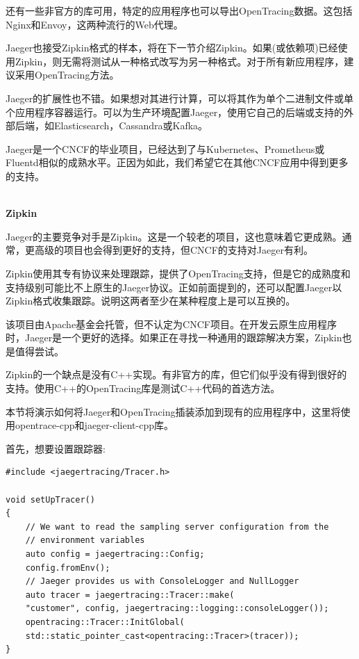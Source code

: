 还有一些非官方的库可用，特定的应用程序也可以导出OpenTracing数据。这包括Nginx和Envoy，这两种流行的Web代理。

Jaeger也接受Zipkin格式的样本，将在下一节介绍Zipkin。如果(或依赖项)已经使用Zipkin，则无需将测试从一种格式改写为另一种格式。对于所有新应用程序，建议采用OpenTracing方法。

Jaeger的扩展性也不错。如果想对其进行计算，可以将其作为单个二进制文件或单个应用程序容器运行。可以为生产环境配置Jaeger，使用它自己的后端或支持的外部后端，如Elasticsearch，Cassandra或Kafka。

Jaeger是一个CNCF的毕业项目，已经达到了与Kubernetes、Prometheus或Fluentd相似的成熟水平。正因为如此，我们希望它在其他CNCF应用中得到更多的支持。

\hspace*{\fill} \\ %
\noindent
\textbf{Zipkin}

Jaeger的主要竞争对手是Zipkin。这是一个较老的项目，这也意味着它更成熟。通常，更高级的项目也会得到更好的支持，但CNCF的支持对Jaeger有利。

Zipkin使用其专有协议来处理跟踪，提供了OpenTracing支持，但是它的成熟度和支持级别可能比不上原生的Jaeger协议。正如前面提到的，还可以配置Jaeger以Zipkin格式收集跟踪。说明这两者至少在某种程度上是可以互换的。

该项目由Apache基金会托管，但不认定为CNCF项目。在开发云原生应用程序时，Jaeger是一个更好的选择。如果正在寻找一种通用的跟踪解决方案，Zipkin也是值得尝试。

Zipkin的一个缺点是没有C++实现。有非官方的库，但它们似乎没有得到很好的支持。使用C++的OpenTracing库是测试C++代码的首选方法。


本节将演示如何将Jaeger和OpenTracing插装添加到现有的应用程序中，这里将使用opentrace-cpp和jaeger-client-cpp库。

首先，想要设置跟踪器:

\begin{lstlisting}[style=styleCXX]
#include <jaegertracing/Tracer.h>

void setUpTracer()
{
	// We want to read the sampling server configuration from the
	// environment variables
	auto config = jaegertracing::Config;
	config.fromEnv();
	// Jaeger provides us with ConsoleLogger and NullLogger
	auto tracer = jaegertracing::Tracer::make(
	"customer", config, jaegertracing::logging::consoleLogger());
	opentracing::Tracer::InitGlobal(
	std::static_pointer_cast<opentracing::Tracer>(tracer));
}
\end{lstlisting}

